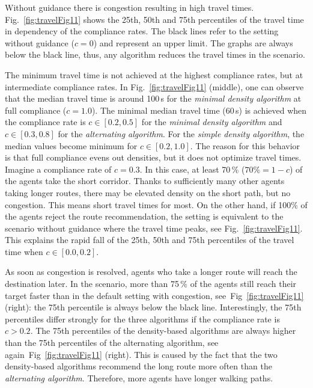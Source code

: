 Without guidance there is congestion resulting in high travel times. Fig.~\ref{fig:travelFig11} shows the 25th, 50th and 75th percentiles  of the travel time in dependency of the compliance rates. The black lines  refer to the  setting without guidance ($c=0$)
and represent an upper limit. The graphs are always below the black line, thus,
any algorithm reduces the travel times in the scenario. 

The minimum travel time is not achieved at the highest compliance rates, but at intermediate compliance rates. In Fig.~\ref{fig:travelFig11} (middle), one can observe that the median travel time is around 100\,s for the \textit{minimal density algorithm} at full compliance ($c=1.0$). The minimal median travel time (60\,s) is achieved when the compliance rate is $c \in [0.2,0.5]$ for the \textit{minimal density algorithm} and $c \in [0.3,0.8]$ for the \textit{alternating algorithm}. For the \textit{simple density algorithm}, the median values become minimum for $c \in [0.2,1.0]$.
The reason for this behavior is that full compliance evens out densities, but it does not optimize travel times. 
Imagine a compliance rate of $c=0.3$. In this case, at least 70\,\% ($ 70\%=1-c$) of the agents take the short corridor. Thanks to sufficiently many other agents taking longer routes, there may be elevated density on the short path, but no congestion. This means short travel times for most. 
%
On the other hand, if 100\% of the agents reject the route recommendation, the setting 
is equivalent to the scenario without guidance where the travel time peaks, see Fig.~\ref{fig:travelFig11}. This explains the rapid fall of the 25th, 50th and 75th percentiles of the travel time when $c \in [0.0,0.2]$. 

As soon as congestion is resolved, agents who take a longer route will reach the destination later. In the scenario, more than 75\,\% of the agents still reach their target faster than in the default setting with congestion, see~Fig~\ref{fig:travelFig11} (right): the 75th percentile is always below the black line. Interestingly, the 75th percentiles differ strongly for the three algorithms if the compliance rate is $c> 0.2$. The 75th percentiles of the density-based algorithms are always higher than the 75th percentiles of the alternating algorithm, see again~Fig~\ref{fig:travelFig11} (right). This is caused by the fact that the two density-based algorithms recommend the long route more often than the \textit{alternating algorithm}. Therefore, more agents have longer walking paths.





